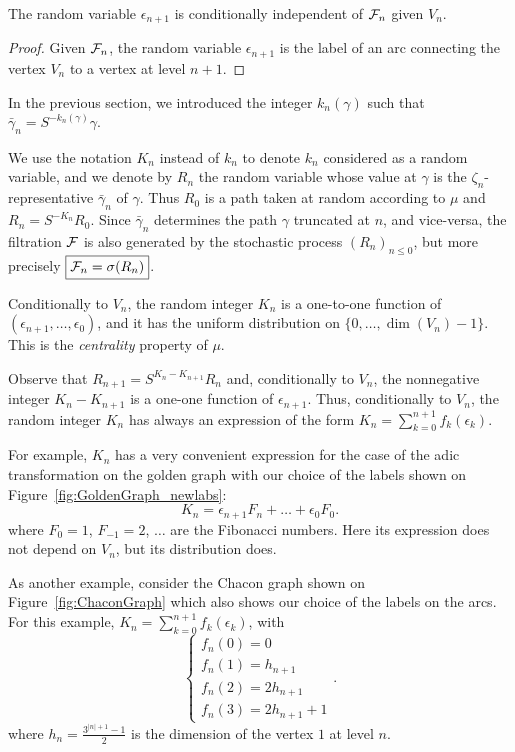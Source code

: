 \documentclass[12pt,a4paper]{article}
\begin{document}
\begin{lemma}
The random variable $\epsilon_{n+1}$ is conditionally independent of $\mathcal{F}_n$ 
given $V_n$. 
\end{lemma} 

\begin{proof}
Given $\mathcal{F}_n$, the random variable $\epsilon_{n+1}$ is the label of an 
arc connecting the vertex $V_n$ to a vertex at level $n+1$. 
\end{proof}

In the previous section, we introduced the integer $k_n(\gamma)$ such that 
$\bar\gamma_n = S^{-k_n(\gamma)}\gamma$. 


We use the notation $K_n$ instead of $k_n$ to denote $k_n$ considered as 
a random variable, and we denote by $R_n$ the random variable whose 
value at $\gamma$ is the $\zeta_n$-representative 
$\bar\gamma_n$ of $\gamma$. 
Thus $R_0$ is a path taken at random according to $\mu$ and 
$R_n = S^{-K_n} R_0$. Since $\bar\gamma_n$ determines the path 
$\gamma$ truncated at $n$, and vice-versa, the filtration $\mathcal{F}$ is also 
generated by the stochastic process ${(R_n)}_{n \leq 0}$, but more precisely
$\boxed{\mathcal{F}_n = \sigma(R_n)}$. 
 
Conditionally to $V_n$, the random integer $K_n$ is a one-to-one function of 
$(\epsilon_{n+1}, \ldots, \epsilon_0)$, and it has the 
uniform distribution on $\{0, \ldots, \dim(V_n)-1\}$. 
This is the \emph{centrality} property of $\mu$. 

Observe that $R_{n+1} = S^{K_n - K_{n+1}}R_n$ and, 
conditionally to $V_n$, the nonnegative integer $K_n - K_{n+1}$ 
is a one-one function of $\epsilon_{n+1}$. 
Thus, conditionally to $V_n$, the random integer $K_n$ has always 
an expression of the form $K_n = \sum_{k=0}^{n+1}f_k(\epsilon_k)$. 

For example, $K_n$ has a very convenient expression for the case of the adic 
transformation on the golden graph with our choice of the labels shown on 
Figure~\ref{fig:GoldenGraph_newlabs}:
$$
K_n = \epsilon_{n+1}F_{n} + \ldots + \epsilon_0F_0.   
$$
where $F_0=1$, $F_{-1}=2$,  $\ldots$ are the Fibonacci numbers.  
Here its expression does not depend on $V_n$, but its distribution does. 

As another example, consider the Chacon graph shown on Figure~\ref{fig:ChaconGraph} 
which also shows our choice of the labels on the arcs. 
For this example, 
$K_n=\sum_{k=0}^{n+1}f_k(\epsilon_k)$, with  
$$
\begin{cases}
f_n(0) = 0 \\ 
f_n(1) = h_{n+1} \\ 
f_n(2) = 2h_{n+1} \\
f_n(3) = 2 h_{n+1} + 1
\end{cases}.
$$
where $h_n=\frac{3^{|n|+1}-1}{2}$ is the dimension of the vertex $1$ at level $n$. 
\end{document}
